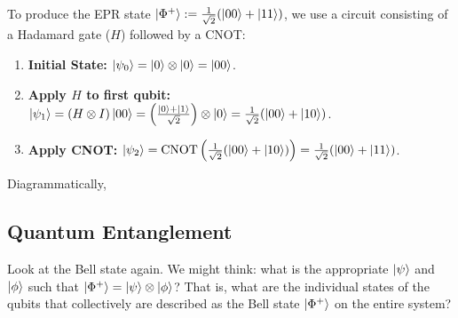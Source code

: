 \begin{example}
To produce the EPR state $\ket{\Phi^+}:= \frac{1}{\sqrt{2}}(\ket{00} + \ket{11})$, we use a circuit consisting of a Hadamard gate ($H$) followed by a CNOT:
\begin{enumerate}
    \item \textbf{Initial State:} $\ket{\psi_0} = \ket{0} \otimes \ket{0} = \ket{00}$.
    \item \textbf{Apply $H$ to first qubit:} $\ket{\psi_1} = (H \otimes I)\ket{00} = \left(\frac{\ket{0} + \ket{1}}{\sqrt{2}}\right) \otimes \ket{0} = \frac{1}{\sqrt{2}}(\ket{00} + \ket{10})$.
    \item \textbf{Apply CNOT:} $\ket{\psi_2} = \text{CNOT} \left( \frac{1}{\sqrt{2}}(\ket{00} + \ket{10}) \right) = \frac{1}{\sqrt{2}}(\ket{00} + \ket{11})$.
\end{enumerate}

Diagrammatically,
    \begin{center}
    \end{center}
\end{example}

\subsection{Quantum Entanglement}
Look at the Bell state again. We might think: what is the appropriate $\ket{\psi}$ and $\ket{\phi}$ such that $\ket{\Phi^+} = \ket{\psi} \otimes \ket{\phi}$? That is, what are the individual states of the qubits that collectively are described as the Bell state $\ket{\Phi^+}$ on the entire system?

